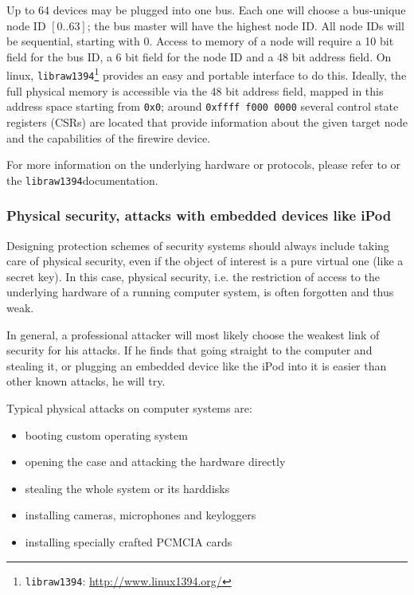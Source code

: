 Up to 64 devices may be plugged into one bus. Each one will choose a bus-unique
node ID $[0..63]$; the bus master will have the highest node ID. All node IDs
will be sequential, starting with 0. Access to memory of a node will require a
10 bit field for the bus ID, a 6 bit field for the node ID and a 48 bit address
field.  On linux, \texttt{libraw1394}\footnote{\texttt{libraw1394}:
\href{http://www.linux1394.org/}{http://www.linux1394.org/}} provides an easy
and portable interface to do this. Ideally, the full physical memory is
accessible via the 48 bit address field, mapped in this address space starting
from \texttt{0x0}; around \texttt{0xffff~f000~0000} several control state
registers (CSRs) are located that provide information about the given target
node and the capabilities of the firewire device.

For more information on the underlying hardware or protocols, please refer to
\cite{OHCIspecs:2000,fwire_sys_arch:2222} or the
\texttt{libraw1394}\footnotemark[\value{footnote}] documentation.



\subsubsection{Physical security, attacks with embedded devices like iPod}

Designing protection schemes of security systems should always include taking
care of physical security, even if the object of interest is a pure virtual one
(like a secret key). In this case, physical security, i.e. the restriction of
access to the underlying hardware of a running computer system, is often
forgotten and thus weak.

In general, a professional attacker will most likely choose the weakest link of
security for his attacks. If he finds that going straight to the computer and
stealing it, or plugging an embedded device like the iPod into it is easier than
other known attacks, he will try.

Typical physical attacks on computer systems are:

\begin{itemize}

	\item booting custom operating system

	\item opening the case and attacking the hardware directly

	\item stealing the whole system or its harddisks

	\item installing cameras, microphones and keyloggers

	\item installing specially crafted PCMCIA cards

\end{itemize}

